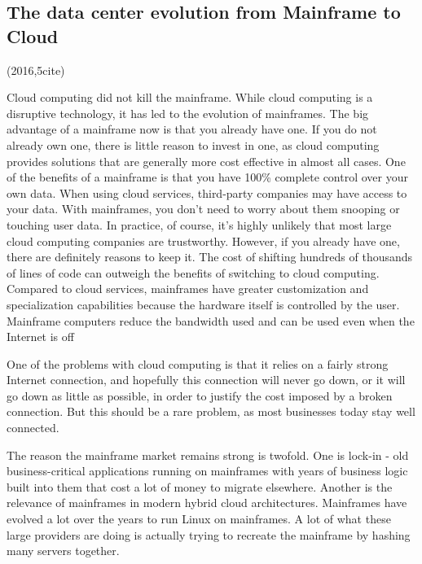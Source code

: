 \documentclass[a4paper,twoside]{scrbook}
\begin{document}
\subsection{The data center evolution from Mainframe to Cloud \cite{zlatanov2016data}}
(2016,5cite)\par
Cloud computing did not kill the mainframe. While cloud computing is a disruptive technology, it has led to the evolution of mainframes.
The big advantage of a mainframe now is that you already have one. If you do not already own one, there is little reason to invest in one, as cloud computing provides solutions that are generally more cost effective in almost all cases.
One of the benefits of a mainframe is that you have 100\% complete control over your own data. When using cloud services, third-party companies may have access to your data. With mainframes, you don't need to worry about them snooping or touching user data. In practice, of course, it's highly unlikely that most large cloud computing companies are trustworthy.
However, if you already have one, there are definitely reasons to keep it. The cost of shifting hundreds of thousands of lines of code can outweigh the benefits of switching to cloud computing.
Compared to cloud services, mainframes have greater customization and specialization capabilities because the hardware itself is controlled by the user. Mainframe computers reduce the bandwidth used and can be used even when the Internet is off
\par
One of the problems with cloud computing is that it relies on a fairly strong Internet connection, and hopefully this connection will never go down, or it will go down as little as possible, in order to justify the cost imposed by a broken connection. But this should be a rare problem, as most businesses today stay well connected.
\par
The reason the mainframe market remains strong is twofold. One is lock-in - old business-critical applications running on mainframes with years of business logic built into them that cost a lot of money to migrate elsewhere.
Another is the relevance of mainframes in modern hybrid cloud architectures. Mainframes have evolved a lot over the years to run Linux on mainframes. A lot of what these large providers are doing is actually trying to recreate the mainframe by hashing many servers together.
\end{document}
